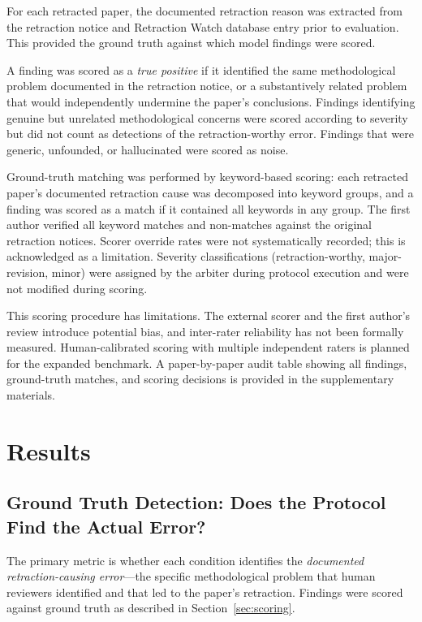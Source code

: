 \documentclass[11pt]{article}
\begin{document}
For each retracted paper, the documented retraction reason was extracted from the retraction notice and Retraction Watch database entry prior to evaluation. This provided the ground truth against which model findings were scored.

A finding was scored as a \emph{true positive} if it identified the same methodological problem documented in the retraction notice, or a substantively related problem that would independently undermine the paper's conclusions. Findings identifying genuine but unrelated methodological concerns were scored according to severity but did not count as detections of the retraction-worthy error. Findings that were generic, unfounded, or hallucinated were scored as noise.

Ground-truth matching was performed by keyword-based scoring: each retracted paper's documented retraction cause was decomposed into keyword groups, and a finding was scored as a match if it contained all keywords in any group. The first author verified all keyword matches and non-matches against the original retraction notices. Scorer override rates were not systematically recorded; this is acknowledged as a limitation. Severity classifications (retraction-worthy, major-revision, minor) were assigned by the arbiter during protocol execution and were not modified during scoring.

This scoring procedure has limitations. The external scorer and the first author's review introduce potential bias, and inter-rater reliability has not been formally measured. Human-calibrated scoring with multiple independent raters is planned for the expanded benchmark. A paper-by-paper audit table showing all findings, ground-truth matches, and scoring decisions is provided in the supplementary materials.

\section{Results}
\label{sec:results}

\subsection{Ground Truth Detection: Does the Protocol Find the Actual Error?}
\label{sec:ground_truth}

The primary metric is whether each condition identifies the \emph{documented retraction-causing error}---the specific methodological problem that human reviewers identified and that led to the paper's retraction. Findings were scored against ground truth as described in Section~\ref{sec:scoring}.
\end{document}
